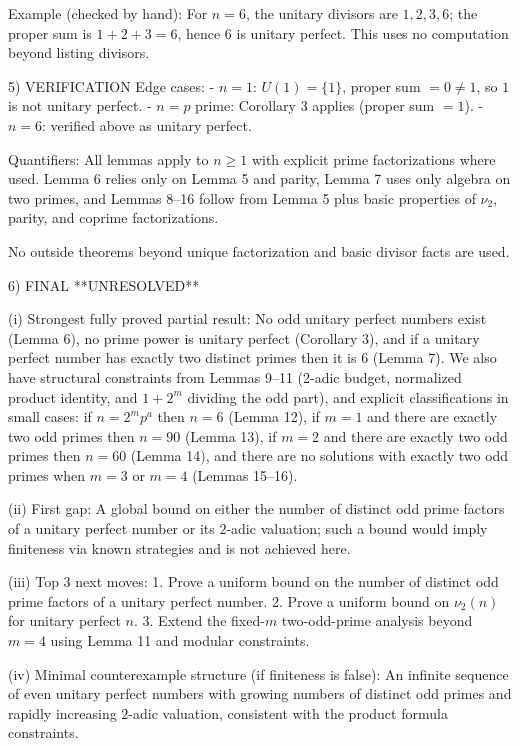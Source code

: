Example (checked by hand):
For $n=6$, the unitary divisors are $1,2,3,6$; the proper sum is $1+2+3=6$, hence $6$ is unitary perfect.
This uses no computation beyond listing divisors.

5) VERIFICATION
Edge cases:
- $n=1$: $U(1)=\{1\}$, proper sum $=0\ne 1$, so $1$ is not unitary perfect.
- $n=p$ prime: Corollary 3 applies (proper sum $=1$).
- $n=6$: verified above as unitary perfect.

Quantifiers:
All lemmas apply to $n\ge 1$ with explicit prime factorizations where used.
Lemma 6 relies only on Lemma 5 and parity, Lemma 7 uses only algebra on two primes, and
Lemmas 8--16 follow from Lemma 5 plus basic properties of $\nu_2$, parity, and coprime factorizations.

No outside theorems beyond unique factorization and basic divisor facts are used.

6) FINAL
**UNRESOLVED**

(i) Strongest fully proved partial result:
No odd unitary perfect numbers exist (Lemma 6), no prime power is unitary perfect (Corollary 3),
and if a unitary perfect number has exactly two distinct primes then it is $6$ (Lemma 7).
We also have structural constraints from Lemmas 9--11 (2-adic budget, normalized product identity,
and $1+2^m$ dividing the odd part), and explicit classifications in small cases:
if $n=2^m p^a$ then $n=6$ (Lemma 12), if $m=1$ and there are exactly two odd primes then $n=90$
(Lemma 13), if $m=2$ and there are exactly two odd primes then $n=60$ (Lemma 14), and
there are no solutions with exactly two odd primes when $m=3$ or $m=4$ (Lemmas 15--16).

(ii) First gap:
A global bound on either the number of distinct odd prime factors of a unitary perfect number or its
$2$-adic valuation; such a bound would imply finiteness via known strategies and is not achieved here.

(iii) Top 3 next moves:
1. Prove a uniform bound on the number of distinct odd prime factors of a unitary perfect number.
2. Prove a uniform bound on $\nu_2(n)$ for unitary perfect $n$.
3. Extend the fixed-$m$ two-odd-prime analysis beyond $m=4$ using Lemma 11 and modular constraints.

(iv) Minimal counterexample structure (if finiteness is false):
An infinite sequence of even unitary perfect numbers with growing numbers of distinct odd primes
and rapidly increasing $2$-adic valuation, consistent with the product formula constraints.


